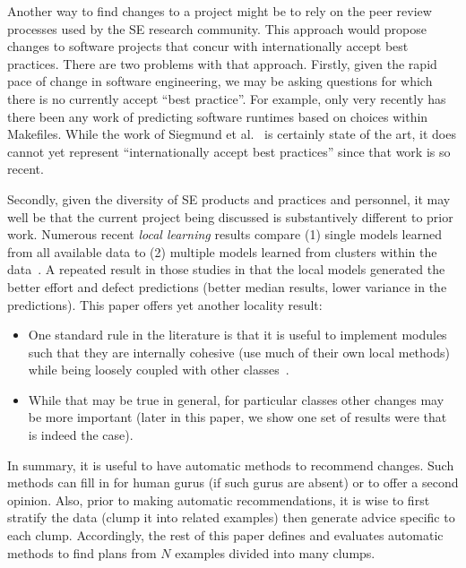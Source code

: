 \documentclass{sig-alternate}
\newcommand{\bi}{\begin{itemize}}
\newcommand{\ei}{\end{itemize}}
\begin{document}
Another way  to find   changes to a project
might be to rely
on the peer review processes used by the 
SE research community. This approach would propose changes to software
projects that concur with internationally accept best practices. 
There are two
problems with that approach. Firstly, given the rapid pace of change in software
engineering, we may be asking questions for which there is no currently accept
``best practice''. For example, only very recently has there been any work
of predicting software runtimes based on choices within Makefiles. While the work
of Siegmund et al.~\cite{sven12} is certainly state of the art, it does
cannot yet represent ``internationally accept best practices'' since that work is so
recent. 

Secondly, given the diversity of SE products and practices
and personnel, it may well be that the current project being discussed is 
substantively different to prior work. 
Numerous recent {\em local learning} results compare (1) single models
learned from all available data to (2) multiple models learned from clusters within the data~\cite{betten14,yang11,yang13,minku13,me12d,me11m,posnett11}.
A repeated result in those studies in that the local models generated the better effort
and defect predictions (better median results,
lower variance in the predictions). This paper offers yet another locality result:
\bi
\item
One standard rule in the literature
is that it is useful to implement modules such that they are internally cohesive (use
much of their own local methods) while being loosely coupled with other classes~\cite{Dhama199565}.
\item
While that may be true in general, for particular classes other changes may be more important
(later in this paper, we show one set of results were that is indeed the case).
\ei
In summary, 
it is useful to have automatic methods to recommend changes. Such
methods can fill in for human gurus (if such gurus are absent) or 
to offer a second opinion.
Also, prior to making automatic recommendations, it is wise to first stratify the data
(clump it into related examples) then generate advice specific to each clump.
Accordingly, the rest of this paper defines and evaluates
automatic methods to find plans from
  $N$ examples divided  into  many clumps.
\end{document}
